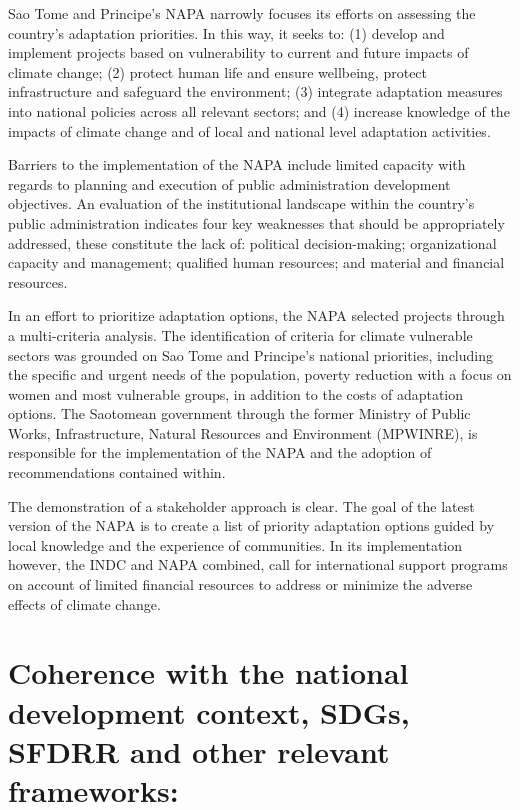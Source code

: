 \documentclass[
]{book}
\begin{document}
Sao Tome and Principe's NAPA narrowly focuses its efforts on assessing the country's adaptation priorities. In this way, it seeks to: (1) develop and implement projects based on vulnerability to current and future impacts of climate change; (2) protect human life and ensure wellbeing, protect infrastructure and safeguard the environment; (3) integrate adaptation measures into national policies across all relevant sectors; and (4) increase knowledge of the impacts of climate change and of local and national level adaptation activities.

Barriers to the implementation of the NAPA include limited capacity with regards to planning and execution of public administration development objectives. An evaluation of the institutional landscape within the country's public administration indicates four key weaknesses that should be appropriately addressed, these constitute the lack of: political decision-making; organizational capacity and management; qualified human resources; and material and financial resources.

In an effort to prioritize adaptation options, the NAPA selected projects through a multi-criteria analysis. The identification of criteria for climate vulnerable sectors was grounded on Sao Tome and Principe's national priorities, including the specific and urgent needs of the population, poverty reduction with a focus on women and most vulnerable groups, in addition to the costs of adaptation options. The Saotomean government through the former Ministry of Public Works, Infrastructure, Natural Resources and Environment (MPWINRE), is responsible for the implementation of the NAPA and the adoption of recommendations contained within.

The demonstration of a stakeholder approach is clear. The goal of the latest version of the NAPA is to create a list of priority adaptation options guided by local knowledge and the experience of communities. In its implementation however, the INDC and NAPA combined, call for international support programs on account of limited financial resources to address or minimize the adverse effects of climate change.

\hypertarget{coherence-with-the-national-development-context-sdgs-sfdrr-and-other-relevant-frameworks}{%
\section{Coherence with the national development context, SDGs, SFDRR and other relevant frameworks:}\label{coherence-with-the-national-development-context-sdgs-sfdrr-and-other-relevant-frameworks}}
\end{document}
